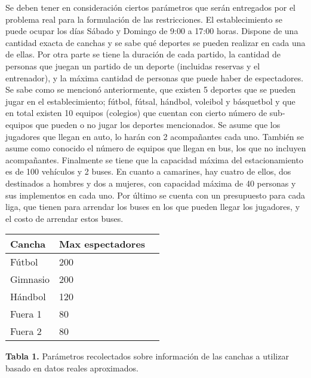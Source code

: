 \indent Se deben tener en consideración ciertos parámetros que serán entregados por el problema real para la formulación de las restricciones.  El establecimiento se puede ocupar los días Sábado y Domingo de 9:00 a 17:00 horas.  Dispone de una cantidad exacta de canchas y se sabe qué deportes se pueden realizar en cada una de ellas. Por otra parte se tiene la duración de cada partido, la cantidad de personas que juegan un partido de un deporte (incluidas reservas y el entrenador), y la máxima cantidad de personas que puede haber de espectadores. Se sabe como se mencionó anteriormente, que existen 5 deportes que se pueden jugar en el establecimiento; fútbol, fútsal, hándbol, voleibol y básquetbol y que en total existen 10 equipos (colegios) que cuentan con cierto número de sub-equipos que pueden o no jugar los deportes mencionados. Se asume que los jugadores que llegan en auto, lo harán con 2 acompañantes cada uno. También se asume como conocido el número de equipos que llegan en bus, los que no incluyen acompañantes. Finalmente se tiene que la capacidad máxima del estacionamiento es de 100 vehículos y 2 buses. En cuanto a camarines, hay cuatro de ellos, dos destinados a hombres y dos a mujeres, con capacidad máxima de 40 personas y sus implementos en cada uno. Por último se cuenta con un presupuesto para cada liga, que tienen para arrendar los buses en los que pueden llegar los jugadores, y el costo de arrendar estos buses.\\

\begin{center}
\begin{tabular}{|l|l|l|}
\hline
Cancha & Max espectadores\\
\hline \hline
Fútbol &  200 \\ \hline
Gimnasio & 200 \\ \hline
Hándbol & 120 \\ \hline
Fuera 1 & 80 \\ \hline
Fuera 2 & 80 \\ \hline
\end{tabular}
\vspace{5pt}
\begin{flushleft}
\footnotesize{\textbf{Tabla 1.} Parámetros recolectados sobre información de las canchas a utilizar basado en datos reales aproximados.}
\end{flushleft}
\end{center}



